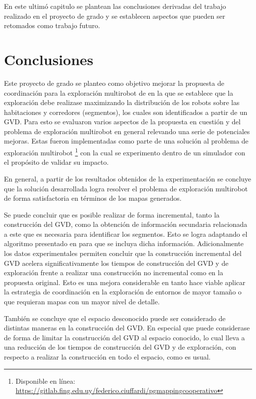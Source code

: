 En este ultimó capitulo se plantean las conclusiones derivadas del trabajo
realizado en el proyecto de grado y se establecen aspectos que pueden ser
retomados como trabajo futuro.

\section{Conclusiones}

Este proyecto de grado se planteo como objetivo mejorar la propuesta de
coordinación para la exploración multirobot de \cite{wurm2008coordinated} en la
que se establece que la exploración debe realizase maximizando la distribución
de los robots sobre las habitaciones y corredores (segmentos), los cuales son
identificados a partir de un GVD. Para esto se evaluaron varios aspectos de la
propuesta en cuestión y del problema de exploración multirobot en general
relevando una serie de potenciales mejoras. Estas fueron implementadas como
parte de una solución al problema de exploración multirobot \footnote{Disponible en línea:\\
\url{https://gitlab.fing.edu.uy/federico.ciuffardi/pgmappingcooperativo}} con la cual se
experimento dentro de un simulador con el propósito de validar su impacto.

En general, a partir de los resultados obtenidos de la experimentación se
concluye que la solución desarrollada logra resolver el problema de exploración
multirobot de forma satisfactoria en términos de los mapas generados.

Se puede concluir que es posible realizar de forma incremental, tanto la
construcción del GVD, como la obtención de información secundaria relacionada a
este que es necesaria para identificar los segmentos. Esto se logra adaptando
el algoritmo presentado en \cite{Lau2013} para que se incluya dicha
información. Adicionalmente los datos experimentales permiten concluir que la
construcción incremental del GVD acelera significativamente los tiempos de
construcción del GVD y de exploración frente a realizar una construcción no
incremental como en la propuesta original. Esto es una mejora considerable en
tanto hace viable aplicar la estrategia de coordinación en la exploración de
entornos de mayor tamaño o que requieran mapas con un mayor nivel de detalle.

También se concluye que el espacio desconocido puede ser considerado de
distintas maneras en la construcción del GVD. En especial que puede considerase de
forma de limitar la construcción del GVD al espacio conocido, lo cual lleva a
una reducción de los tiempos de construcción del GVD y de exploración, con
respecto a realizar la construcción en todo el espacio, como es usual.

